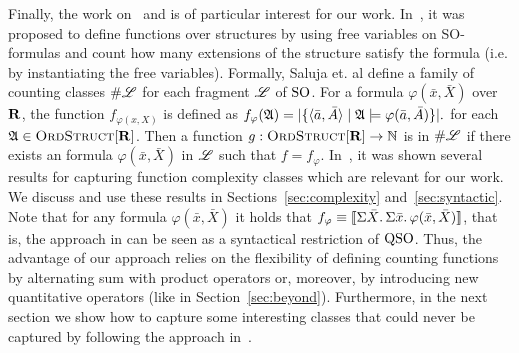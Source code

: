 Finally, the work on~\cite{SalujaST95} and \cite{ComptonG96} is of particular interest for our work. 
In~\cite{SalujaST95}, it was proposed to define functions over structures by using free variables on SO-formulas and count how many extensions of the structure satisfy the formula (i.e. by instantiating the free variables). 
Formally, Saluja et. al \cite{SalujaST95} define a family of counting classes $\#\mathscr{L}$ for each fragment $\mathscr{L}$ of ${\rm SO}$. For a formula $\varphi(\bar{x},\bar{X})$ over $\mathbf{R}$, the function $f_{\varphi(x,X)}$ is defined as
$
f_{\varphi}(\mathfrak{A}) = \vert \{\langle \bar{a},\bar{A} \rangle\mid \mathfrak{A}\models\varphi(\bar{a},\bar{A})\}\vert.
$
for each $\mathfrak{A}\in\text{\sc OrdStruct}[\mathbf{R}]$. Then a function $g:\text{\sc OrdStruct}[\mathbf{R}]\to\mathbb{N}$ is in $\#\mathscr{L}$ if there exists an formula $\varphi(\bar{x},\bar{X})$ in $\mathscr{L}$ such that $f = f_{\varphi}$. 
In~\cite{SalujaST95}, it was shown several results for capturing function complexity classes which are relevant for our work. We discuss and use these results in Sections~\ref{sec:complexity} and~\ref{sec:syntactic}.
Note that for any formula $\varphi(\bar{x},\bar{X})$ it holds that $f_\varphi \equiv {\llbracket{}{\Sigma{\bar{X}}.\, \Sigma{\bar{x}}.\, \varphi(\bar{x},\bar{X})}\rrbracket}$, that is, the approach in \cite{SalujaST95} can be seen as a syntactical restriction of ${\rm QSO}$. 
Thus, the advantage of our approach relies on the flexibility of defining  counting functions by alternating sum with product operators or, moreover, by introducing new quantitative operators (like in Section~\ref{sec:beyond}).
Furthermore, in the next section we show how to capture some interesting classes that could never be captured by following the approach in~\cite{SalujaST95}.
